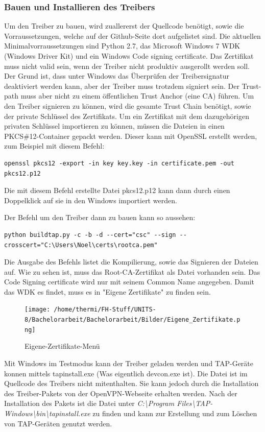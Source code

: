 \subsubsection{Bauen und Installieren des Treibers}
Um den Treiber zu bauen, wird zuallererst der Quellcode benötigt, sowie die
Vorraussetzungen, welche auf der Github-Seite dort aufgelistet sind.
Die aktuellen Minimalvorraussetzungen sind Python 2.7, das Microsoft Windows 7 WDK (Windows Driver Kit)
und ein Windows Code signing certificate.
Das Zertifikat muss nicht valid sein, wenn der Treiber nicht produktiv ausgerollt
werden soll. Der Grund ist, dass unter Windows das Überprüfen der Treibersignatur deaktiviert
werden kann, aber der Treiber muss trotzdem signiert sein. Der Trust-path muss aber nicht
zu einem öffentlichen Trust Anchor (eine CA) führen. Um den Treiber signieren zu können,
wird die gesamte Trust Chain benötigt, sowie der private Schlüssel des Zertifikats.
Um ein Zertifikat mit dem dazugehörigen privaten Schlüssel importieren zu können,
müssen die Dateien in einen PKCS\#12-Container gepackt werden. Dieser kann mit 
OpenSSL erstellt werden, zum Beispiel mit diesem Befehl:
\begin{lstlisting}[caption=OpenSSL PKCS\#12]
openssl pkcs12 -export -in key key.key -in certificate.pem -out pkcs12.p12
\end{lstlisting}
Die mit diesem Befehl erstellte Datei pkcs12.p12 kann dann durch einen Doppelklick auf sie
in den Windows importiert werden.

Der Befehl um den Treiber dann zu bauen kann so aussehen:
\begin{lstlisting}[caption=TAP-Windows bauen]
python buildtap.py -c -b -d --cert="csc" --sign --crosscert="C:\Users\Noel\certs\rootca.pem"
\end{lstlisting}
Die Ausgabe des Befehls listet die Kompilierung, sowie das Signieren der Dateien auf.
Wie zu sehen ist, muss das Root-CA-Zertifikat als Datei vorhanden sein.
Das Code Signing certificate wird nur mit seinem Common Name angegeben.
Damit das WDK es findet, muss es in "Eigene Zertifikate" zu finden sein.
\begin{figure}
\texttt{[image: /home/thermi/FH-Stuff/UNITS-8/Bachelorarbeit/Bachelorarbeit/Bilder/Eigene\_Zertifikate.png]}
\caption{Eigene-Zertifikate-Menü}
\label{fig:Eigene-Zertifikate-Menue}
\end{figure}

Mit Windows im Testmodus kann der Treiber geladen werden und TAP-Geräte konnen
mittels tapinstall.exe (Was eigentlich devcon.exe ist). Die Datei ist im Quellcode des
Treibers nicht mitenthalten. Sie kann jedoch durch die Installation des Treiber-Pakets
von der OpenVPN-Webseite erhalten werden. Nach der Installation des Pakets
ist die Datei unter \textit{C:\textbackslash{}Program Files\textbackslash{}TAP-Windows\textbackslash{}bin\textbackslash{}tapinstall.exe}
zu finden und kann zur Erstellung und zum Löschen von TAP-Geräten genutzt werden.

